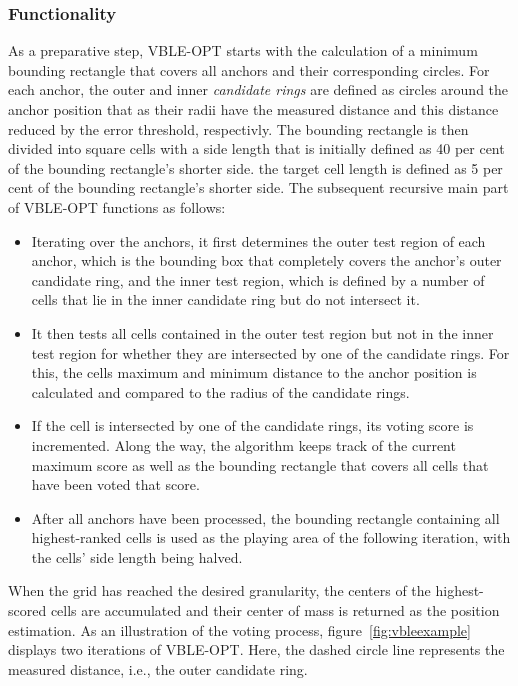 \subsubsection{Functionality}
As a preparative step, VBLE-OPT starts with the calculation of a minimum bounding rectangle that covers all anchors and their corresponding circles. For each anchor, the outer and inner \emph{candidate rings} are defined as circles around the anchor position that as their radii have the measured distance and this distance reduced by the error threshold, respectivly. The bounding rectangle is then divided into square cells with a side length that is initially defined as 40 per cent of the bounding rectangle's shorter side. the target cell length is defined as 5 per cent of the bounding rectangle's shorter side. The subsequent recursive main part of VBLE-OPT functions as follows:
\begin{itemize}
\item Iterating over the anchors, it first determines the outer test region of each anchor, which is the bounding box that completely covers the anchor's outer candidate ring, and the inner test region, which is defined by a number of cells that lie in the inner candidate ring but do not intersect it.
\item It then tests all cells contained in the outer test region but not in the inner test region for whether they are intersected by one of the candidate rings. For this, the cells maximum and minimum distance to the anchor position is calculated and compared to the radius of the candidate rings.
\item If the cell is intersected by one of the candidate rings, its voting score is incremented. Along the way, the algorithm keeps track of the current maximum score as well as the bounding rectangle that covers all cells that have been voted that score.
\item After all anchors have been processed, the bounding rectangle containing all highest-ranked cells is used as the playing area of the following iteration, with the cells' side length being halved.
\end{itemize}
When the grid has reached the desired granularity, the centers of the highest-scored cells are accumulated and their center of mass is returned as the position estimation. As an illustration of the voting process, figure~\ref{fig:vbleexample} displays two iterations of VBLE-OPT. Here, the dashed circle line represents the measured distance, i.e., the outer candidate ring. 

